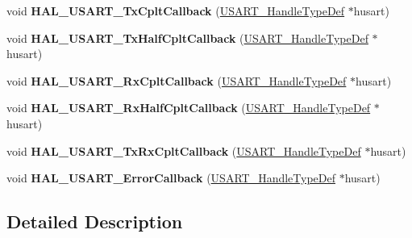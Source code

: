 \begin{DoxyCompactItemize}
\item 
void {\bfseries H\+A\+L\+\_\+\+U\+S\+A\+R\+T\+\_\+\+Tx\+Cplt\+Callback} (\hyperlink{struct_u_s_a_r_t___handle_type_def}{U\+S\+A\+R\+T\+\_\+\+Handle\+Type\+Def} $\ast$husart)\hypertarget{group___u_s_a_r_t___exported___functions___group2_ga140f7cd834ae6359fcb4a71e0fe29909}{}\label{group___u_s_a_r_t___exported___functions___group2_ga140f7cd834ae6359fcb4a71e0fe29909}

\item 
void {\bfseries H\+A\+L\+\_\+\+U\+S\+A\+R\+T\+\_\+\+Tx\+Half\+Cplt\+Callback} (\hyperlink{struct_u_s_a_r_t___handle_type_def}{U\+S\+A\+R\+T\+\_\+\+Handle\+Type\+Def} $\ast$husart)\hypertarget{group___u_s_a_r_t___exported___functions___group2_ga107416fd537ed66aaaf530581c1a2c0a}{}\label{group___u_s_a_r_t___exported___functions___group2_ga107416fd537ed66aaaf530581c1a2c0a}

\item 
void {\bfseries H\+A\+L\+\_\+\+U\+S\+A\+R\+T\+\_\+\+Rx\+Cplt\+Callback} (\hyperlink{struct_u_s_a_r_t___handle_type_def}{U\+S\+A\+R\+T\+\_\+\+Handle\+Type\+Def} $\ast$husart)\hypertarget{group___u_s_a_r_t___exported___functions___group2_ga5937cf9bb1958b927bf34900d19c9724}{}\label{group___u_s_a_r_t___exported___functions___group2_ga5937cf9bb1958b927bf34900d19c9724}

\item 
void {\bfseries H\+A\+L\+\_\+\+U\+S\+A\+R\+T\+\_\+\+Rx\+Half\+Cplt\+Callback} (\hyperlink{struct_u_s_a_r_t___handle_type_def}{U\+S\+A\+R\+T\+\_\+\+Handle\+Type\+Def} $\ast$husart)\hypertarget{group___u_s_a_r_t___exported___functions___group2_ga2b22726b27e640b3d37a896ef5113b49}{}\label{group___u_s_a_r_t___exported___functions___group2_ga2b22726b27e640b3d37a896ef5113b49}

\item 
void {\bfseries H\+A\+L\+\_\+\+U\+S\+A\+R\+T\+\_\+\+Tx\+Rx\+Cplt\+Callback} (\hyperlink{struct_u_s_a_r_t___handle_type_def}{U\+S\+A\+R\+T\+\_\+\+Handle\+Type\+Def} $\ast$husart)\hypertarget{group___u_s_a_r_t___exported___functions___group2_ga5ed0ad2c026a5d53cda4485557558eaa}{}\label{group___u_s_a_r_t___exported___functions___group2_ga5ed0ad2c026a5d53cda4485557558eaa}

\item 
void {\bfseries H\+A\+L\+\_\+\+U\+S\+A\+R\+T\+\_\+\+Error\+Callback} (\hyperlink{struct_u_s_a_r_t___handle_type_def}{U\+S\+A\+R\+T\+\_\+\+Handle\+Type\+Def} $\ast$husart)\hypertarget{group___u_s_a_r_t___exported___functions___group2_gae7e2b482040e13cb538fa507617f8229}{}\label{group___u_s_a_r_t___exported___functions___group2_gae7e2b482040e13cb538fa507617f8229}

\end{DoxyCompactItemize}


\subsection{Detailed Description}
